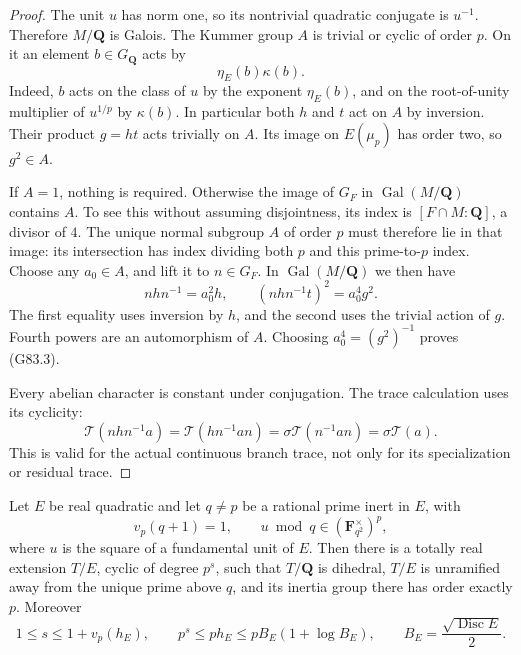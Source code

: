 \begin{proof}
The unit \(u\) has norm one, so its nontrivial quadratic
conjugate is \(u^{-1}\).  Therefore \(M/\mathbf Q\) is Galois.
The Kummer group \(A\) is trivial or cyclic of order \(p\).
On it an element \(b\in G_{\mathbf Q}\) acts by
\[
                       \eta_E(b)\kappa(b).         \tag{G83.4}
\]
Indeed, \(b\) acts on the class of \(u\) by the exponent
\(\eta_E(b)\), and on the root-of-unity multiplier of
\(u^{1/p}\) by \(\kappa(b)\).
In particular both \(h\) and \(t\) act on \(A\) by inversion.
Their product \(g=ht\) acts trivially on \(A\).
Its image on \(E(\mu_p)\) has order two, so \(g^2\in A\).

If \(A=1\), nothing is required.  Otherwise the image of
\(G_F\) in \(\operatorname{Gal}(M/\mathbf Q)\) contains \(A\).
To see this without assuming disjointness, its index is
\([F\cap M:\mathbf Q]\), a divisor of \(4\).
The unique normal subgroup \(A\) of order \(p\) must therefore
lie in that image: its intersection has index dividing both
\(p\) and this prime-to-\(p\) index.
Choose any \(a_0\in A\), and lift it to \(n\in G_F\).
In \(\operatorname{Gal}(M/\mathbf Q)\) we then have
\[
 nhn^{-1}=a_0^2h,\qquad
 (nhn^{-1}t)^2=a_0^4g^2.                           \tag{G83.5}
\]
The first equality uses inversion by \(h\), and the second
uses the trivial action of \(g\).
Fourth powers are an automorphism of \(A\).
Choosing \(a_0^4=(g^2)^{-1}\) proves (G83.3).

Every abelian character is constant under conjugation.
The trace calculation uses its cyclicity:
\[
 \mathcal T(nhn^{-1}a)
    =\mathcal T(hn^{-1}an)
    =\sigma\mathcal T(n^{-1}an)
    =\sigma\mathcal T(a).
\]
This is valid for the actual continuous branch trace, not
only for its specialization or residual trace.
\end{proof}

\begin{proposition}
\label{prop:G83-ray}
Let \(E\) be real quadratic and let \(q\ne p\) be a rational
prime inert in \(E\), with
\[
 v_p(q+1)=1,\qquad
 u\bmod q\in(\mathbf F_{q^2}^{\times})^p,            \tag{G83.6}
\]
where \(u\) is the square of a fundamental unit of \(E\).
Then there is a totally real extension \(T/E\), cyclic of
degree \(p^s\), such that \(T/\mathbf Q\) is dihedral, \(T/E\)
is unramified away from the unique prime above \(q\), and its
inertia group there has order exactly \(p\).  Moreover
\[
 1\le s\le1+v_p(h_E),\qquad
 p^s\le p h_E\le p B_E(1+\log B_E),\qquad
 B_E=\frac{\sqrt{\operatorname{Disc}E}}2.            \tag{G83.7}
\]
\end{proposition}

